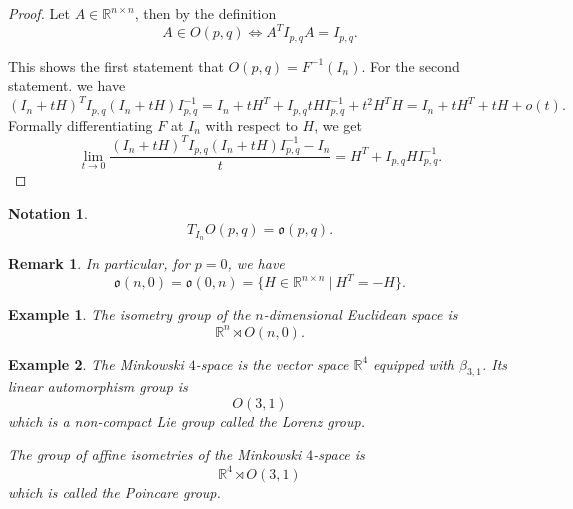 \documentclass{article}
\newtheorem{notation}{Notation}[section]
\newtheorem{remark}{Remark}[section]
\newtheorem{example}{Example}[section]
\numberwithin{equation}{section}
\begin{document}
\begin{proof}
Let $A\in \mathbb{R}^{n\times n}$, then by the definition
\begin{equation*}
A\in O(p,q)\Leftrightarrow A^TI_{p,q}A = I_{p,q}.
\end{equation*}

This shows the first statement that $O(p,q)=F^{-1}(I_n)$. For the second statement. we have
\begin{equation*}
(I_n+tH)^TI_{p,q}(I_n+tH)I_{p,q}^{-1} = I_n+tH^T+I_{p,q}tHI_{p,q}^{-1}+t^2H^TH = I_n+tH^T+tH+o(t).
\end{equation*}
Formally differentiating $F$ at $I_n$ with respect to $H$, we get
\begin{equation*}
\lim_{t\to 0}{\frac {(I_n+tH)^TI_{p,q}(I_n+tH)I_{p,q}^{-1} -I_n} {t}} = H^T+I_{p,q}HI_{p,q}^{-1}.
\end{equation*}
\end{proof}

\begin{notation}
\begin{equation*}
T_{I_n}O(p,q) = \mathfrak{o}(p,q).
\end{equation*}
\end{notation}

\begin{remark}
In particular, for $p=0$, we have
\begin{equation*}
\mathfrak{o}(n,0)=\mathfrak{o}(0,n) = \{ H\in\mathbb{R}^{n\times n}\:|\: H^T=-H\}.
\end{equation*}
\end{remark}

\begin{example}
The isometry group of the $n$-dimensional Euclidean space is 
\begin{equation*}
\mathbb{R}^n\rtimes O(n,0).
\end{equation*}
\end{example}

\begin{example}
The Minkowski $4$-space is  the vector space $\mathbb{R}^4$ equipped with $\beta_{3,1}$. Its linear automorphism group is
\begin{equation*}
O(3,1)
\end{equation*}
which is a non-compact Lie group called the Lorenz group.\\
\par The group of affine isometries of the Minkowski $4$-space is 
\begin{equation*}
\mathbb{R}^4\rtimes O(3,1)
\end{equation*}
which is called the Poincare group.
\end{example}
\end{document}
